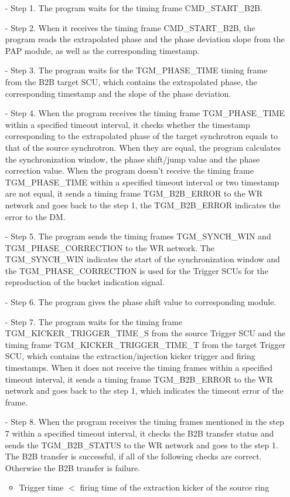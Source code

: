 \begin{itemize}
 	\begin{itemize}
		\item[-]Step 1. The program waits for the timing frame CMD\_START\_B2B.
 		\item[-]Step 2. When it receives the timing frame CMD\_START\_B2B, the program reads the extrapolated phase and the phase deviation slope from the PAP module, as well as the corresponding timestamp.
		\item[-]Step 3. The program waits for the TGM\_PHASE\_TIME timing frame from the B2B target SCU, which contains the extrapolated phase, the corresponding timestamp and the slope of the phase deviation.
		\item[-]Step 4. When the program receives the timing frame TGM\_PHASE\_TIME within a specified timeout interval, it checks whether the timestamp corresponding to the extrapolated phase of the target synchrotron equals to that of the source synchrotron. When they are equal, the program calculates the synchronization window, the phase shift/jump value and the phase correction value. When the program doesn't receive the timing frame TGM\_PHASE\_TIME within a specified timeout interval or two timestamp are not equal, it sends a timing frame TGM\_B2B\_ERROR to the WR network and goes back to the step 1, the TGM\_B2B\_ERROR indicates the error to the DM.  
		\item[-]Step 5. The program sends the timing frames TGM\_SYNCH\_WIN and TGM\_PHASE\_CORRECTION to the WR network. The TGM\_SYNCH\_WIN indicates the start of the synchronization window and the TGM\_PHASE\_CORRECTION is used for the Trigger SCUs for the reproduction of the bucket indication signal.
		\item[-]Step 6. The program gives the phase shift value to corresponding module.
		\item[-]Step 7. The program waits for the timing frame TGM\_KICKER\_TRIGGER\_TIME\_S from the source Trigger SCU and the timing frame TGM\_KICKER\_TRIGGER\_TIME\_T from the target Trigger SCU, which contains the extraction/injection kicker trigger and firing timestamps. When it does not receive the timing frames within a specified timeout interval, it sends a timing frame TGM\_B2B\_ERROR to the WR network and goes back to the step 1, which indicates the timeout error of the frame.
		\item[-]Step 8. When the program receives the timing frames mentioned in the step 7 within a specified timeout interval, it checks the B2B transfer status and sends the TGM\_B2B\_STATUS to the WR network and goes to the step 1. The B2B transfer is successful, if all of the following checks are correct. Otherwise the B2B transfer is failure. 
\begin{itemize}
	\item Trigger time $<$ firing time of the extraction kicker of the source ring


\end{itemize}
\end{itemize}
\end{itemize}
